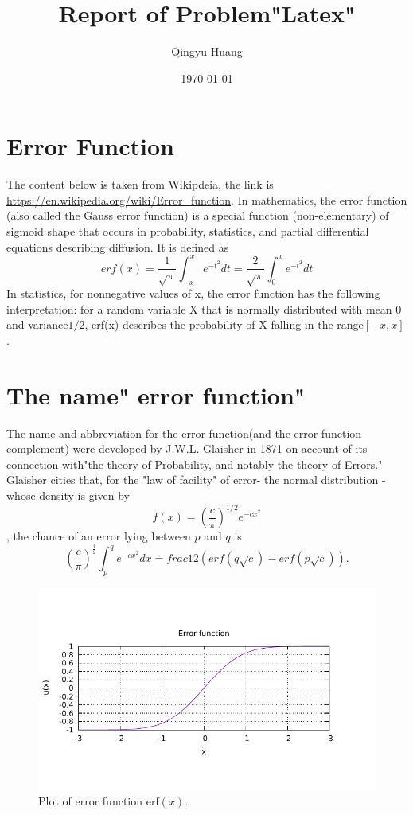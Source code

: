 \documentclass[11pt,english]{article}
\begin{document}
\title{Report of Problem"Latex"}
\author{Qingyu Huang}
\date{\today}
\maketitle
\thispagestyle{empty}

\newpage
\section{Error Function}
The content below is taken from Wikipdeia, the link is \url{https://en.wikipedia.org/wiki/Error_function}.
In mathematics, the error function (also called the Gauss error function) is a special function (non-elementary) of sigmoid shape that occurs in probability, statistics, and partial differential equations describing diffusion. It is defined as
\begin{equation}
erf(x)=\frac{1}{\sqrt{\pi}}\int_{-x}^x e^{-t^2} dt = \frac{2}{\sqrt{\pi}}\int_0^x e^{-t^2} dt
\end{equation}
In statistics, for nonnegative values of x, the error function has the following interpretation: for a random variable X that is normally distributed with mean $0$ and variance$1/2$, erf(x) describes the probability of X falling in the range$ [-x, x]$.

\section{The name" error function"}
The name and abbreviation for the error function(and the error function complement) were developed by J.W.L. Glaisher in 1871 on account of its connection with"the theory of Probability, and notably the theory of Errors." Glaisher cities that, for the "law of facility" of error- the normal distribution - whose density is given by
\begin{equation}
f(x)=(\frac{c}{\pi})^{1/2}e^{-cx^{2}}
\end{equation}
, the chance of an error lying between $p$ and $q$ is
\begin{equation}
(\frac{c}{\pi})^{\frac{1}{2}}\int_p^q e^{-cx^{2}} dx= frac{1}{2}(erf(q\sqrt{c})-erf(p\sqrt{c})).
\end{equation}

\begin{figure}
\centering
\includegraphics[width=1\linewidth]{plot}
\caption{Plot of error function erf$(x)$.}
\end{figure}
\end{document}

